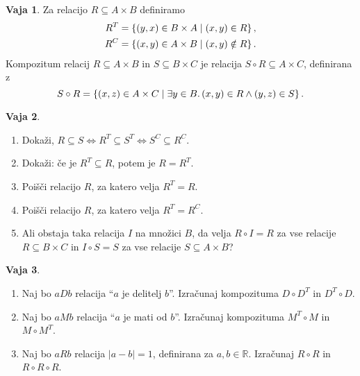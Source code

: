 \documentclass{article}
\newcommand{\some}[1]{\exists #1 .\,}
\newcommand{\RR}{\mathbb{R}}
\theoremstyle{definition}
\newtheorem{vaja}{Vaja}
\begin{document}
\begin{vaja}
Za relacijo $R \subseteq A \times B$ definiramo
%
\begin{align*}
  R^T &= \set{(y,x) \in B \times A}{(x,y) \in R},\\
  R^C &= \set{(x,y) \in A \times B}{(x,y) \notin R}.
\end{align*}
%
Kompozitum relacij $R \subseteq A \times B$ in $S \subseteq B \times
C$ je relacija $S \circ R \subseteq A \times C$, definirana z
%
\begin{equation*}
  S \circ R = \set{(x,z) \in A \times C}{\some{y \in B}{(x,y) \in R \land (y,z) \in S}}.
\end{equation*}
\end{vaja}

\begin{vaja}
\begin{enumerate}
  \item Dokaži, $R \subseteq S \iff R^T \subseteq
  S^T \iff S^C \subseteq R^C$.

  \item Dokaži: če je $R^T \subseteq R$, potem je $R = R^T$.

  \item Poišči relacijo $R$, za katero velja $R^T = R$.

  \item Poišči relacijo $R$, za katero velja $R^T = R^C$.


  \item Ali obstaja taka relacija $I$ na množici $B$, da velja $R
  \circ I = R$ za vse relacije $R \subseteq B \times C$ in $I \circ S
  = S$ za vse relacije $S \subseteq A \times B$?
\end{enumerate}
\end{vaja}

\begin{vaja}
\begin{enumerate}
  \item Naj bo $a D b$ relacija ``$a$ je delitelj $b$''. Izračunaj
  kompozituma $D \circ D^T$ in $D^T \circ D$.

  \item Naj bo $a M b$ relacija ``$a$ je mati od $b$''. Izračunaj
  kompozituma $M^T \circ M$ in $M \circ M^T$.

  \item Naj bo $a R b$ relacija $|a - b| = 1$, definirana za $a, b
  \in \RR$. Izračunaj $R \circ R$ in $R \circ R \circ R$.
\end{enumerate}
\end{vaja}
\end{document}
